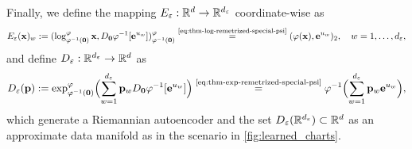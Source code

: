     Finally, we define the mapping $E_\varepsilon:\mathbb{R}^d \to \mathbb{R}^{d_\varepsilon}$ coordinate-wise as
\begin{equation}
    E_\varepsilon(\mathbf{x})_w := (\log^\varphi_{\varphi^{-1}(\mathbf{0})} \mathbf{x}, D_{\mathbf{0}}\varphi^{-1}[\mathbf{e}^{u_w}])^\varphi_{\varphi^{-1}(\mathbf{0})} \overset{\text{\ref{eq:thm-log-remetrized-special-psi}}}{=} (\varphi(\mathbf{x}), \mathbf{e}^{u_w})_2, \quad w = 1, \ldots, d_\varepsilon,
    \label{eq:rae-encoder}
\end{equation}
and define $D_\varepsilon:\mathbb{R}^{d_\varepsilon} \to \mathbb{R}^d$ as
\begin{equation}
    D_\varepsilon(\mathbf{p}):= \exp_{\varphi^{-1}(\mathbf{0})}^\varphi \Bigl( \sum_{w=1}^{d_\varepsilon} \mathbf{p}_w D_{\mathbf{0}}\varphi^{-1}[\mathbf{e}^{u_w}]\Bigr) \overset{\text{\ref{eq:thm-exp-remetrized-special-psi}}}{=} \varphi^{-1} \Bigl( \sum_{w=1}^{d_\varepsilon} \mathbf{p}_w \mathbf{e}^{u_w} \Bigr),
    \label{eq:rae-decoder}
\end{equation}
which generate a Riemannian autoencoder and the set $D_\varepsilon(\mathbb{R}^{d_\varepsilon}) \subset \mathbb{R}^d$ as an approximate data manifold as in the scenario in \ref{fig:learned_charts}.

